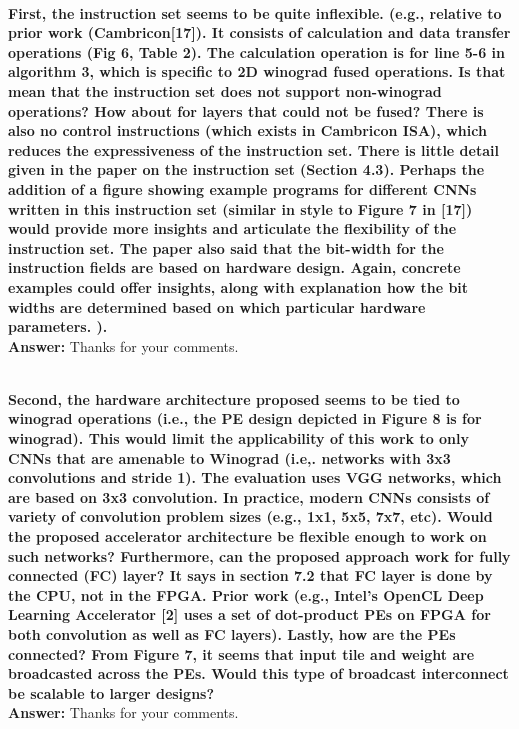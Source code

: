 \documentclass[12pt]{paper}
\newcommand{\rev}[1]{{{\color[rgb]{0,0,1}{#1}}}}
\newcommand{\answer}[1]{\noindent\textbf{Answer:} #1}
\newcommand{\comment}[1]{\noindent\textbf{\\ #1}\\}
\begin{document}
\comment{First, the instruction set seems to be quite inflexible. (e.g., relative to prior work (Cambricon[17]). It consists of calculation and data transfer operations (Fig 6, Table 2). The calculation operation is for line 5-6 in algorithm 3, which is specific to 2D winograd fused operations. Is that mean that the instruction set does not support non-winograd operations? How about for layers that could not be fused? There is also no control instructions (which exists in Cambricon ISA), which reduces the expressiveness of the instruction set. There is little detail given in the paper on the instruction set (Section 4.3). Perhaps the addition of a figure showing example programs for different CNNs written in this instruction set (similar in style to Figure 7 in [17]) would provide more insights and articulate the flexibility of the instruction set. The paper also said that the bit-width for the instruction fields are based on hardware design. Again, concrete examples could offer insights, along with explanation how the bit widths are determined based on which particular hardware parameters. ). 
}
\answer{Thanks for your comments.}
\rev{We have corrected this error.}


\comment{Second, the hardware architecture proposed seems to be tied to winograd operations (i.e., the PE design depicted in Figure 8 is for winograd). This would limit the applicability of this work to only CNNs that are amenable to Winograd (i.e,. networks with 3x3 convolutions and stride 1). The evaluation uses VGG networks, which are based on 3x3 convolution. In practice, modern CNNs consists of variety of convolution problem sizes (e.g., 1x1, 5x5, 7x7, etc). Would the proposed accelerator architecture be flexible enough to work on such networks? Furthermore, can the proposed approach work for fully connected (FC) layer? It says in section 7.2 that FC layer is done by the CPU, not in the FPGA. Prior work (e.g., Intel’s OpenCL Deep Learning Accelerator [2] uses a set of dot-product PEs on FPGA for both convolution as well as FC layers). Lastly, how are the PEs connected? From Figure 7, it seems that input tile and weight are broadcasted across the PEs. Would this type of broadcast interconnect be scalable to larger designs? 
}
\answer{Thanks for your comments.}
\rev{We have corrected this error.}
\end{document}
